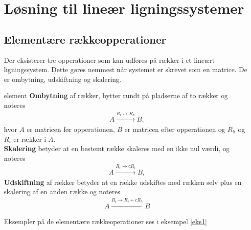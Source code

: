 \section{Løsning til lineær ligningssystemer}


\subsection{Elementære rækkeopperationer}
Der eksisterer tre opperationer som kan udføres på rækker i et lineært ligningssystem.
Dette gøres nemmest når systemet er skrevet som en matrice.
De er ombytning, udskiftning og skalering.

\begin{defn}{}{element}
\textbf{Ombytning} af rækker, bytter rundt på pladserne af to rækker og noteres
\begin{align*}
A \xrightarrow{R_i \leftrightarrow R_h} B, 
\end{align*}
hvor $A$ er matricen før opperationen, $B$ er matricen efter opperationen og $R_h$ og $R_i$ er rækker i $A$.\\
\textbf{Skalering} betyder at en bestemt række skaleres med en ikke nul værdi, og noteres
\begin{align*}
A \xrightarrow{R_i \rightarrow cR_i} B, 
\end{align*}
\textbf{Udskiftning} af rækker betyder at en række udskiftes med rækken selv plus en skalering af en anden række og noteres
\begin{align*}
A \xrightarrow{R_i \rightarrow R_i + cR_h} B
\end{align*}

\end{defn}
\noindent
Eksempler på de elementære rækkeoperationer ses i eksempel \ref{eks1}

